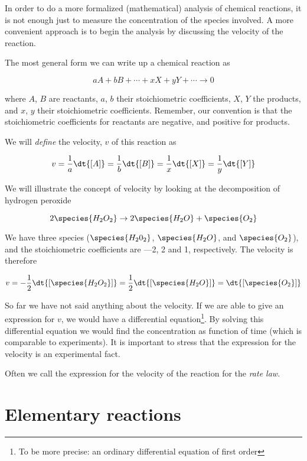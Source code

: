 In order to do a more formalized (\ie mathematical) analysis of chemical reactions, it is not enough just to measure the concentration of the species involved. A more convenient approach is to begin the analysis by discussing the velocity of the reaction.

The most general form we can write up a chemical reaction as

\[
  aA + bB + \cdots + xX + yY + \cdots \rightarrow 0
\]

where $A$, $B$ are reactants, $a$, $b$ their stoichiometric coefficients, $X$, $Y$ the products, and $x$, $y$ their stoichiometric coefficients. Remember, our convention is that the stoichiometric coefficients for reactants are negative, and positive for products.

We will \textit{define} the velocity, $v$ of this reaction as

\begin{equation}
  \label{eq:velocity}
  v = \frac{1}{a}\dt{[A]} = \frac{1}{b}\dt{[B]} = \frac{1}{x}\dt{[X]} = \frac{1}{y}\dt{[Y]}
\end{equation}

\begin{example}
  We will illustrate the concept of velocity by looking at the decomposition of hydrogen peroxide \ie

  \[
      2\species{H_2O_2} \rightarrow 2\species{H_2O} + \species{O_2}
  \]

  We have three species ($\species{H_20_2}$, $\species{H_2O}$, and $\species{O_2}$), and the stoichiometric coefficients are —2, 2 and 1, respectively. The velocity is therefore

  \[
    v = -\frac{1}{2}\dt{[\species{H_2O_2}]} = \frac{1}{2}\dt{[\species{H_2O}]} = \dt{[\species{O_2}]}
  \]
\end{example}

So far we have not said anything about the velocity. If we are able to give an expression for $v$, we would have a differential equation\footnote{To be more precise: an ordinary differential equation of first order}. By solving this differential equation we would find the concentration as function of time (which is comparable to experiments). It is important to stress that the expression for the velocity is an experimental fact.

Often we call the expression for the velocity of the reaction for the \textit{rate law}.

\section{Elementary reactions}
\label{sec:elementaryReactions}

